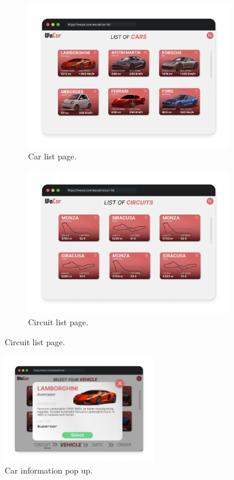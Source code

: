 \begin{figure} [H]
	\centering
	\begin{subfigure}{.5\textwidth}
	    \centering
	    \includegraphics[width=1\textwidth]{mockup/CarList.png}
	    \caption{Car list page.}
	    \label{fig:carlist}
	\end{subfigure}%
	\begin{subfigure}{.5\textwidth}
	    \centering
	    \includegraphics[width=1\textwidth]{mockup/CircuitList.png}
	    \caption{Circuit list page.}
	    \label{fig:circuitlist}
	\end{subfigure}
\end{figure}

\begin{figure}[!h]
    \centering
    \includegraphics[width=0.6\textwidth]{mockup/InfoCar.png}
    \caption{Car information pop up.}
    \label{fig:infocar}
\end{figure}

